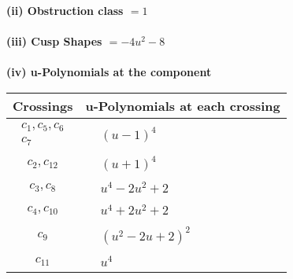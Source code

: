 \documentclass[1p]{elsarticle_modified}
\theoremstyle{definition}
\begin{document}
\flushleft \textbf{(ii) Obstruction class $= 1$}\\~\\
\flushleft \textbf{(iii) Cusp Shapes $= -4 u^2-8$}\\~\\
\newpage\renewcommand{\arraystretch}{1}
\flushleft \textbf{(iv) u-Polynomials at the component}\newline \\
\begin{tabular}{m{50pt}|m{274pt}}
Crossings & \hspace{64pt}u-Polynomials at each crossing \\
\hline $$\begin{aligned}c_{1},c_{5},c_{6}\\c_{7}\end{aligned}$$&$\begin{aligned}
&(u-1)^4
\end{aligned}$\\
\hline $$\begin{aligned}c_{2},c_{12}\end{aligned}$$&$\begin{aligned}
&(u+1)^4
\end{aligned}$\\
\hline $$\begin{aligned}c_{3},c_{8}\end{aligned}$$&$\begin{aligned}
&u^4-2 u^2+2
\end{aligned}$\\
\hline $$\begin{aligned}c_{4},c_{10}\end{aligned}$$&$\begin{aligned}
&u^4+2 u^2+2
\end{aligned}$\\
\hline $$\begin{aligned}c_{9}\end{aligned}$$&$\begin{aligned}
&(u^2-2 u+2)^2
\end{aligned}$\\
\hline $$\begin{aligned}c_{11}\end{aligned}$$&$\begin{aligned}
&u^4
\end{aligned}$\\
\hline
\end{tabular}\\~\\
\end{document}
